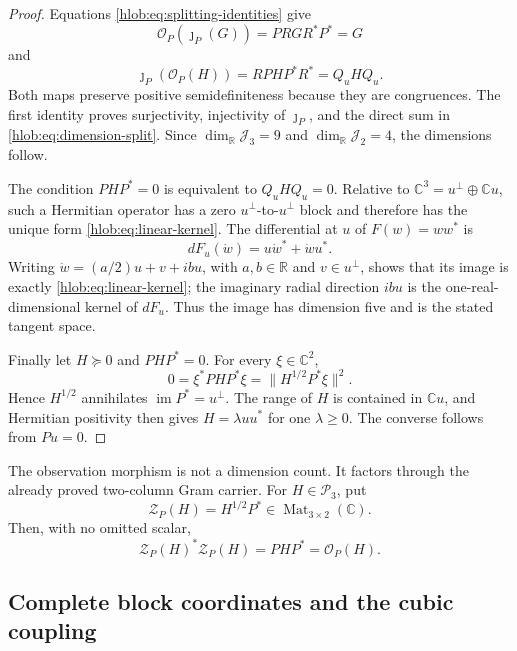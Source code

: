 \begin{proof}
Equations \eqref{hlob:eq:splitting-identities} give
\[
 \mathcal O_P(\jmath_P(G))=PRGR^*P^*=G
\]
and
\[
 \jmath_P(\mathcal O_P(H))=RPH P^*R^*=Q_uHQ_u.
\]
Both maps preserve positive semidefiniteness because they are congruences.
The first identity proves surjectivity, injectivity of \(\jmath_P\), and the
direct sum in \eqref{hlob:eq:dimension-split}.  Since
\(\dim_{\mathbb R}\mathcal J_3=9\) and
\(\dim_{\mathbb R}\mathcal J_2=4\), the dimensions follow.

The condition \(PHP^*=0\) is equivalent to \(Q_uHQ_u=0\).  Relative to
\(\mathbb C^3=u^\perp\oplus\mathbb Cu\), such a Hermitian operator has a
zero \(u^\perp\)-to-\(u^\perp\) block and therefore has the unique form
\eqref{hlob:eq:linear-kernel}.  The differential at \(u\) of
\(F(w)=ww^*\) is
\[
 dF_u(\dot w)=u\dot w^*+\dot w u^*.
\]
Writing \(\dot w=(a/2)u+v+i b u\), with
\(a,b\in\mathbb R\) and \(v\in u^\perp\), shows that its image is exactly
\eqref{hlob:eq:linear-kernel}; the imaginary radial direction \(ibu\) is
the one-real-dimensional kernel of \(dF_u\).  Thus the image has dimension
five and is the stated tangent space.

Finally let \(H\succeq0\) and \(PHP^*=0\).  For every \(\xi\in\mathbb C^2\),
\[
 0=\xi^*PHP^*\xi
   =\lVert H^{1/2}P^*\xi\rVert^2.
\]
Hence \(H^{1/2}\) annihilates
\(\operatorname{im}P^*=u^\perp\).  The range of \(H\) is contained in
\(\mathbb Cu\), and Hermitian positivity then gives
\(H=\lambda uu^*\) for one \(\lambda\geq0\).  The converse follows from
\(Pu=0\).
\end{proof}

The observation morphism is not a dimension count.  It factors through the
already proved two-column Gram carrier.  For \(H\in\mathcal P_3\), put
\begin{equation}
 \mathcal Z_P(H)=H^{1/2}P^*
 \in\operatorname{Mat}_{3\times2}(\mathbb C).
 \label{hlob:eq:gram-factor}
\end{equation}
Then, with no omitted scalar,
\begin{equation}
 \mathcal Z_P(H)^*\mathcal Z_P(H)=PHP^*=\mathcal O_P(H).
 \label{hlob:eq:gram-factor-identity}
\end{equation}

\subsection{Complete block coordinates and the cubic coupling}
\label{hlob:subsec:block-coordinates}

